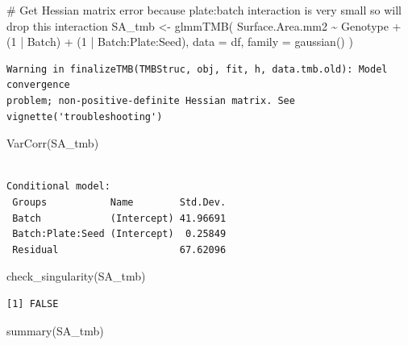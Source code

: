 \documentclass[
  letterpaper,
  DIV=11,
  numbers=noendperiod]{scrartcl}
\newenvironment{Shaded}{\begin{snugshade}}{\end{snugshade}}
\newcommand{\AttributeTok}[1]{\textcolor[rgb]{0.40,0.45,0.13}{#1}}
\newcommand{\CommentTok}[1]{\textcolor[rgb]{0.37,0.37,0.37}{#1}}
\newcommand{\DecValTok}[1]{\textcolor[rgb]{0.68,0.00,0.00}{#1}}
\newcommand{\FunctionTok}[1]{\textcolor[rgb]{0.28,0.35,0.67}{#1}}
\newcommand{\NormalTok}[1]{\textcolor[rgb]{0.00,0.23,0.31}{#1}}
\newcommand{\OtherTok}[1]{\textcolor[rgb]{0.00,0.23,0.31}{#1}}
\newcommand{\SpecialCharTok}[1]{\textcolor[rgb]{0.37,0.37,0.37}{#1}}
\begin{document}
\begin{Shaded}
\begin{Highlighting}[]
\CommentTok{\# Get Hessian matrix error because plate:batch interaction is very small so will drop this interaction}
\NormalTok{SA\_tmb }\OtherTok{\textless{}{-}} \FunctionTok{glmmTMB}\NormalTok{(}
\NormalTok{  Surface.Area.mm2 }\SpecialCharTok{\textasciitilde{}}\NormalTok{ Genotype }\SpecialCharTok{+}\NormalTok{ (}\DecValTok{1} \SpecialCharTok{|}\NormalTok{ Batch) }\SpecialCharTok{+}\NormalTok{ (}\DecValTok{1} \SpecialCharTok{|}\NormalTok{ Batch}\SpecialCharTok{:}\NormalTok{Plate}\SpecialCharTok{:}\NormalTok{Seed),}
  \AttributeTok{data =}\NormalTok{ df, }\AttributeTok{family =} \FunctionTok{gaussian}\NormalTok{()}
\NormalTok{)}
\end{Highlighting}
\end{Shaded}

\begin{verbatim}
Warning in finalizeTMB(TMBStruc, obj, fit, h, data.tmb.old): Model convergence
problem; non-positive-definite Hessian matrix. See vignette('troubleshooting')
\end{verbatim}

\begin{Shaded}
\begin{Highlighting}[]
\FunctionTok{VarCorr}\NormalTok{(SA\_tmb)}
\end{Highlighting}
\end{Shaded}

\begin{verbatim}

Conditional model:
 Groups           Name        Std.Dev.
 Batch            (Intercept) 41.96691
 Batch:Plate:Seed (Intercept)  0.25849
 Residual                     67.62096
\end{verbatim}

\begin{Shaded}
\begin{Highlighting}[]
\FunctionTok{check\_singularity}\NormalTok{(SA\_tmb)}
\end{Highlighting}
\end{Shaded}

\begin{verbatim}
[1] FALSE
\end{verbatim}

\begin{Shaded}
\begin{Highlighting}[]
\FunctionTok{summary}\NormalTok{(SA\_tmb)}
\end{Highlighting}
\end{Shaded}
\end{document}
